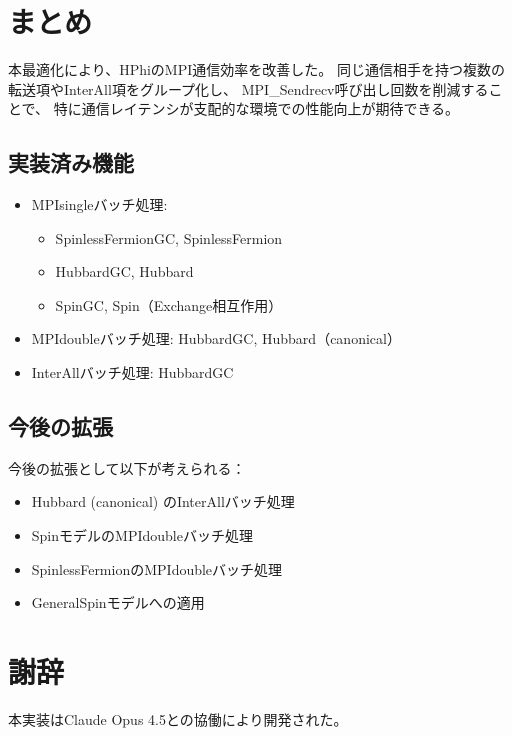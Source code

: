 \documentclass[11pt,a4paper]{article}
\begin{document}
\section{まとめ}

本最適化により、HPhiのMPI通信効率を改善した。
同じ通信相手を持つ複数の転送項やInterAll項をグループ化し、
MPI\_Sendrecv呼び出し回数を削減することで、
特に通信レイテンシが支配的な環境での性能向上が期待できる。

\subsection{実装済み機能}

\begin{itemize}
  \item MPIsingleバッチ処理:
    \begin{itemize}
      \item SpinlessFermionGC, SpinlessFermion
      \item HubbardGC, Hubbard
      \item SpinGC, Spin（Exchange相互作用）
    \end{itemize}
  \item MPIdoubleバッチ処理: HubbardGC, Hubbard（canonical）
  \item InterAllバッチ処理: HubbardGC
\end{itemize}

\subsection{今後の拡張}

今後の拡張として以下が考えられる：
\begin{itemize}
  \item Hubbard (canonical) のInterAllバッチ処理
  \item SpinモデルのMPIdoubleバッチ処理
  \item SpinlessFermionのMPIdoubleバッチ処理
  \item GeneralSpinモデルへの適用
\end{itemize}

\section*{謝辞}

本実装はClaude Opus 4.5との協働により開発された。
\end{document}
